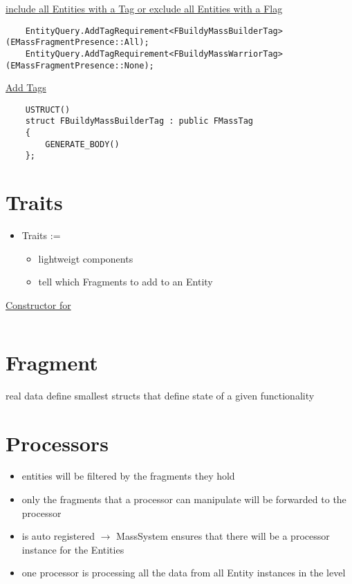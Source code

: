     \uline{include all Entities with a Tag or exclude all Entities with a Flag}
        \begin{lstlisting}
    EntityQuery.AddTagRequirement<FBuildyMassBuilderTag>(EMassFragmentPresence::All);
    EntityQuery.AddTagRequirement<FBuildyMassWarriorTag>(EMassFragmentPresence::None);
        \end{lstlisting}

        \uline{Add Tags}
        \begin{lstlisting}
    USTRUCT()
    struct FBuildyMassBuilderTag : public FMassTag
    {
        GENERATE_BODY()
    };
        \end{lstlisting}

    \section{Traits}
        \begin{itemize}
            \item Traits := 
            \begin{itemize}
                \item lightweigt components 
                \item tell which Fragments to add to an Entity
            \end{itemize}
        \end{itemize}

        \uline{Constructor for }
        \begin{lstlisting}

        \end{lstlisting}
        \label{MassConstructor}


    \section{Fragment}
        real data define smallest structs that define state of a given functionality




    \section{Processors}
        \begin{itemize}
            \item entities will be filtered by the fragments they hold
            \item only the fragments that a processor can manipulate will be forwarded to the processor
            \item is auto registered $\rightarrow$ MassSystem ensures that there will be a processor instance for the Entities
            \item one processor is processing all the data from all Entity instances in the level
        \end{itemize}    
    
